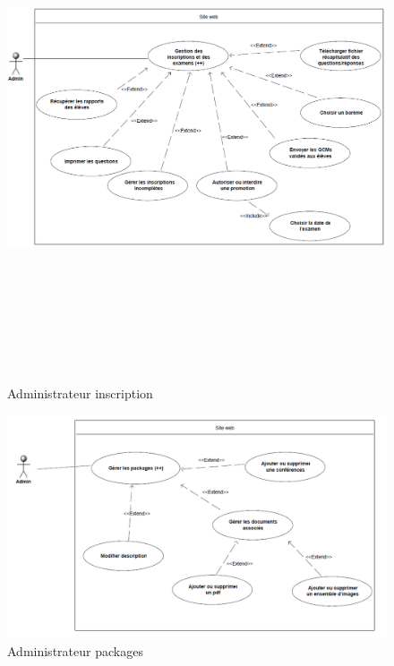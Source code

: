     \begin{figure}[h]
        \begin{center}
            \includegraphics[width=18cm,height=15cm, angle=90]{images/uml/adminInscriptionsExamens.png} 
        \end{center}

        \caption{Administrateur inscription}
        \label{Administrateur inscription}
    \end{figure}

    \begin{figure}[h]
        \begin{center}
            \includegraphics[scale=0.65]{images/uml/adminPackages.png} 
        \end{center}

        \caption{Administrateur packages}
        \label{Administrateur packages}
    \end{figure}

